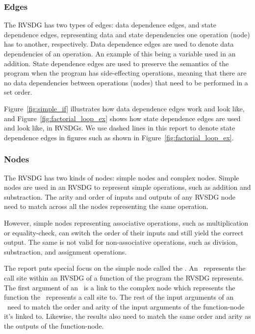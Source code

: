 \subsubsection{Edges}

The RVSDG has two types of edges: data dependence edges, and state dependence
edges, representing data and state dependencies one operation (node) has to
another, respectively. Data dependence edges are used to denote data
dependencies of an operation. An example of this being a variable used in an
addition. State dependence edges are used to preserve the semantics of the
program when the program has side-effecting operations, meaning that there are
no data dependencies between operations (nodes) that need to be performed in a
set order.

Figure~\ref{fig:simple_if} illustrates how data dependence edges work and look
like, and Figure~\ref{fig:factorial_loop_ex} shows how state dependence edges
are used and look like, in RVSDGs. We use dashed lines in this report to denote
state dependence edges in figures such as shown in
Figure~\ref{fig:factorial_loop_ex}.

\subsubsection{Nodes}

The RVSDG has two kinds of nodes: simple nodes and complex nodes. Simple nodes
are used in an RVSDG to represent simple operations, such as addition and
substraction. The arity and order of inputs and outputs of any RVSDG node need
to match across all the nodes representing the same operation.

However, simple nodes representing associative operations, such as
multiplication or equality-check, can switch the order of their inputs and still
yield the correct output. The same is not valid for non-associative operations,
such as division, substraction, and assignment operations.

The report puts special focus on the simple node called the \applyNode . An
\applyNode~represents the call site within an RVSDG of a function of the program
the RVSDG represents. The first argument of an \applyNode~is a link to the
complex node which represents the function the \applyNode~represents a call site
to. The rest of the input arguments of an \applyNode~need to match the order and
arity of the input arguments of the function-node it's linked to. Likewise, the
results also need to match the same order and arity as the outputs of the
function-node.

